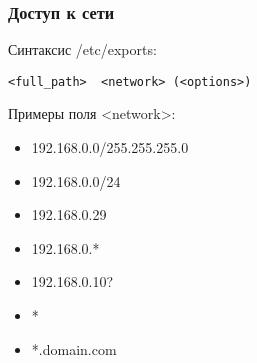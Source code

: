 \begin{frame}[fragile]
    \frametitle{Доступ к сети}

Синтаксис /etc/exports:

\begin{lstlisting}
<full_path>  <network> (<options>)
\end{lstlisting}

Примеры поля <network>:
    \begin{itemize}
        \item 192.168.0.0/255.255.255.0
        \item 192.168.0.0/24
        \item 192.168.0.29
        \item 192.168.0.*
        \item 192.168.0.10?
        \item *
        \item *.domain.com
    \end{itemize}
    

\end{frame}